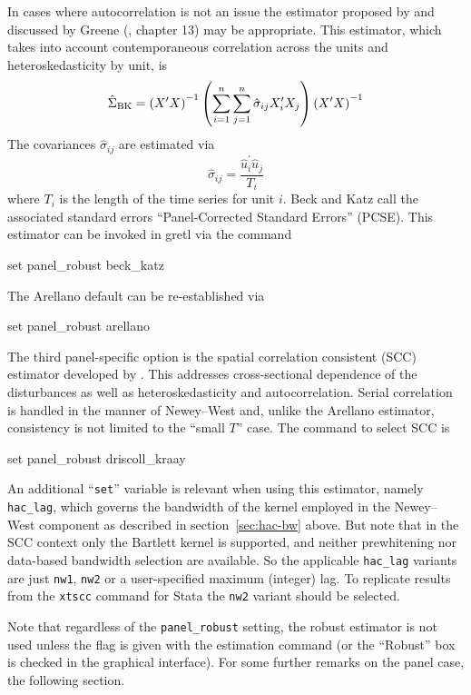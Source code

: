 In cases where autocorrelation is not an issue the estimator proposed
by \cite{beck-katz95} and discussed by Greene (\citeyear{greene03},
chapter 13) may be appropriate.  This estimator, which takes into
account contemporaneous correlation across the units and
heteroskedasticity by unit, is
\[
\hat{\Sigma}_{\rm BK} = 
\left(X^{\prime}X\right)^{-1}
\left( \sum_{i=1}^n \sum_{j=1}^n \hat{\sigma}_{ij} X^{\prime}_iX_j \right)
\left(X^{\prime}X\right)^{-1}
\]
The covariances $\hat{\sigma}_{ij}$ are estimated via
\[
\hat{\sigma}_{ij} = \frac{\hat{u}^{\prime}_i \hat{u}_j}{T_i}
\]
where $T_i$ is the length of the time series for unit $i$.  Beck and
Katz call the associated standard errors ``Panel-Corrected Standard
Errors'' (PCSE).  This estimator can be invoked in gretl via the
command
%
\begin{code}
set panel_robust beck_katz
\end{code}
%
The Arellano default can be re-established via 
%
\begin{code}
set panel_robust arellano
\end{code}

The third panel-specific option is the spatial correlation consistent
(SCC) estimator developed by \cite{driscoll_kraay98}. This addresses
cross-sectional dependence of the disturbances as well as
heteroskedasticity and autocorrelation. Serial correlation is handled
in the manner of Newey--West and, unlike the Arellano estimator,
consistency is not limited to the ``small $T$'' case. The command to
select SCC is
\begin{code}
set panel_robust driscoll_kraay
\end{code}
An additional ``\texttt{set}'' variable is relevant when using this
estimator, namely \texttt{hac\_lag}, which governs the bandwidth of
the kernel employed in the Newey--West component as described in
section~\ref{sec:hac-bw} above. But note that in the SCC context only
the Bartlett kernel is supported, and neither prewhitening nor
data-based bandwidth selection are available.  So the applicable
\texttt{hac\_lag} variants are just \texttt{nw1}, \texttt{nw2} or a
user-specified maximum (integer) lag. To replicate results from the
\texttt{xtscc} command for \textsf{Stata} \citep{hoechle07} the
\texttt{nw2} variant should be selected.

Note that regardless of the \verb|panel_robust| setting, the robust
estimator is not used unless the  flag is given with
the estimation command (or the ``Robust'' box is checked in the
graphical interface). For some further remarks on the panel case, the
following section.

